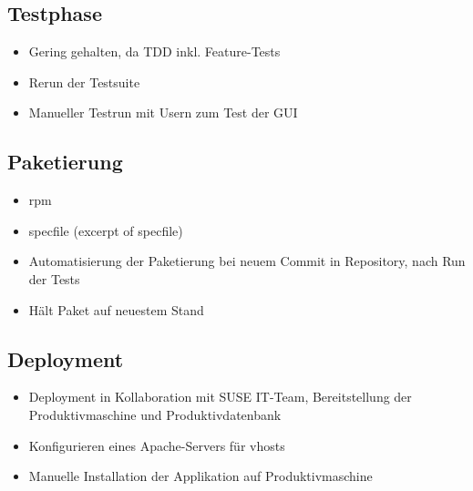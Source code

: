 \subsection{Testphase}
\label{sec:Testphase}
\begin{itemize}
	\item Gering gehalten, da TDD inkl. Feature-Tests
	\item Rerun der Testsuite
	\item Manueller Testrun mit Usern zum Test der GUI
\end{itemize}

\subsection{Paketierung}
\label{sec:Paketierung}
\begin{itemize}
	\item rpm
	\item specfile (excerpt of specfile)
	\item Automatisierung der Paketierung bei neuem Commit in Repository, nach Run der Tests
	\item Hält Paket auf neuestem Stand
\end{itemize}

\subsection{Deployment}
\label{sec:Deployment}
\begin{itemize}
	\item Deployment in Kollaboration mit SUSE IT-Team, Bereitstellung der Produktivmaschine und
	Produktivdatenbank
	\item Konfigurieren eines Apache-Servers für vhosts
	\item Manuelle Installation der Applikation auf Produktivmaschine
\end{itemize}

